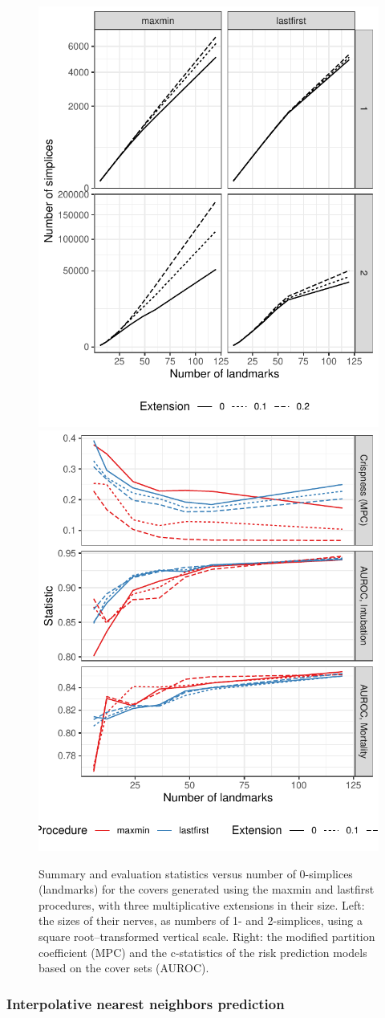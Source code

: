 \documentclass{article}
\begin{document}
\begin{figure}
\includegraphics[width=.5\textwidth]{../figures/cover-simplices-mx}
\includegraphics[width=.5\textwidth]{../figures/cover-evaluate-mx}
\caption{
Summary and evaluation statistics versus number of 0-simplices (landmarks) for the covers generated using the maxmin and lastfirst procedures, with three multiplicative extensions in their size.
Left: the sizes of their nerves, as numbers of 1- and 2-simplices, using a square root--transformed vertical scale.
Right: the modified partition coefficient (MPC) and the c-statistics of the risk prediction models based on the cover sets (AUROC).
\label{fig:cover-mx}
}
\end{figure}

\hypertarget{interpolative-nearest-neighbors-prediction-1}{%
\subsubsection{Interpolative nearest neighbors
prediction}\label{interpolative-nearest-neighbors-prediction-1}}
\end{document}
